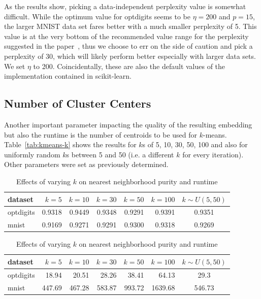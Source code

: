 As the results show, picking a data-independent perplexity value is somewhat difficult.
While the optimum value for optdigits seems to be $\eta = 200$ and $p = 15$, the larger
MNIST data set fares better with a much smaller perplexity of 5. This value is at the
very bottom of the recommended value range for the perplexity suggested in the paper~\cite{tsne},
thus we choose to err on the side of caution and pick a perplexity of 30, which will likely
perform better especially with larger data sets. We set $\eta$ to 200. Coincidentally, these
are also the default values of the implementation contained in scikit-learn.

\vfill

\subsection{Number of Cluster Centers}

Another important parameter impacting the quality of the resulting embedding
but also the runtime is the number of centroids to be used for $k$-means.
Table~\ref{tab:kmeans-k} shows the results for $k$s of 5, 10, 30, 50, 100 and also
for uniformly random $k$s between 5 and 50 (i.e. a different $k$ for every
iteration). Other parameters were set as previously determined.

\begin{table}[tb]
  \centering
\begin{subtable}{\linewidth}
  \centering
  \begin{tabular}{lrrrrrc}
    \toprule
dataset & $k = 5$ & $k = 10$ & $k = 30$ & $k = 50$ & $k = 100$ & $k \sim U(5, 50)$ \\ \midrule
optdigits & \num{0.9318} & \num{0.9449} & \num{0.9348} & \num{0.9291} & \num{0.9391} & \num{0.9351} \\
mnist & \num{0.9169} & \num{0.9271} & \num{0.9291} & \num{0.9300} & \num{0.9318} & \num{0.9269} \\
    \bottomrule
  \end{tabular}
  \caption{Nearest neighborhood purity}
  \label{tab:kmeans-k}
\end{subtable}
\par\bigskip
\begin{subtable}{\linewidth}
    \centering
  \begin{tabular}{lrrrrrc}
    \toprule
dataset & $k = 5$ & $k = 10$ & $k = 30$ & $k = 50$ & $k = 100$ & $k \sim U(5, 50)$ \\ \midrule
optdigits & \num{18.94} & \num{20.51} & \num{28.26} & \num{38.41} & \num{64.13} & \num{29.3} \\
mnist & \num{447.69} & \num{467.28} & \num{583.87} & \num{993.72} & \num{1639.68} & \num{546.73} \\
    \bottomrule
  \end{tabular}
  \caption{Runtime in seconds}
  \label{tab:k-time}
\end{subtable}
\caption{Effects of varying $k$ on nearest neighborhood purity and runtime}
\end{table}

